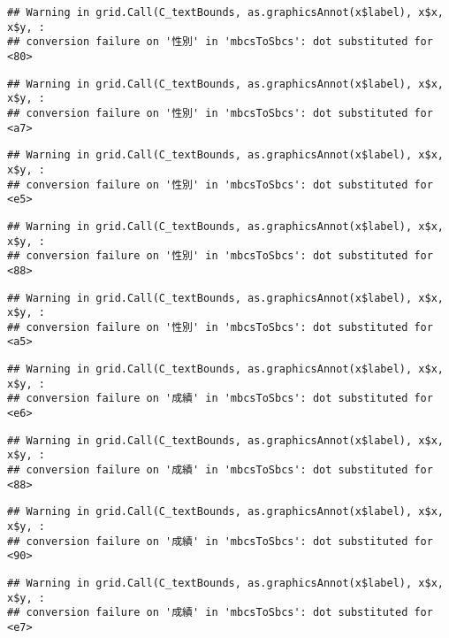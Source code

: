 \documentclass[
]{book}
\begin{document}
\begin{verbatim}
## Warning in grid.Call(C_textBounds, as.graphicsAnnot(x$label), x$x, x$y, :
## conversion failure on '性別' in 'mbcsToSbcs': dot substituted for <80>
\end{verbatim}

\begin{verbatim}
## Warning in grid.Call(C_textBounds, as.graphicsAnnot(x$label), x$x, x$y, :
## conversion failure on '性別' in 'mbcsToSbcs': dot substituted for <a7>
\end{verbatim}

\begin{verbatim}
## Warning in grid.Call(C_textBounds, as.graphicsAnnot(x$label), x$x, x$y, :
## conversion failure on '性別' in 'mbcsToSbcs': dot substituted for <e5>
\end{verbatim}

\begin{verbatim}
## Warning in grid.Call(C_textBounds, as.graphicsAnnot(x$label), x$x, x$y, :
## conversion failure on '性別' in 'mbcsToSbcs': dot substituted for <88>
\end{verbatim}

\begin{verbatim}
## Warning in grid.Call(C_textBounds, as.graphicsAnnot(x$label), x$x, x$y, :
## conversion failure on '性別' in 'mbcsToSbcs': dot substituted for <a5>
\end{verbatim}

\begin{verbatim}
## Warning in grid.Call(C_textBounds, as.graphicsAnnot(x$label), x$x, x$y, :
## conversion failure on '成績' in 'mbcsToSbcs': dot substituted for <e6>
\end{verbatim}

\begin{verbatim}
## Warning in grid.Call(C_textBounds, as.graphicsAnnot(x$label), x$x, x$y, :
## conversion failure on '成績' in 'mbcsToSbcs': dot substituted for <88>
\end{verbatim}

\begin{verbatim}
## Warning in grid.Call(C_textBounds, as.graphicsAnnot(x$label), x$x, x$y, :
## conversion failure on '成績' in 'mbcsToSbcs': dot substituted for <90>
\end{verbatim}

\begin{verbatim}
## Warning in grid.Call(C_textBounds, as.graphicsAnnot(x$label), x$x, x$y, :
## conversion failure on '成績' in 'mbcsToSbcs': dot substituted for <e7>
\end{verbatim}
\end{document}
